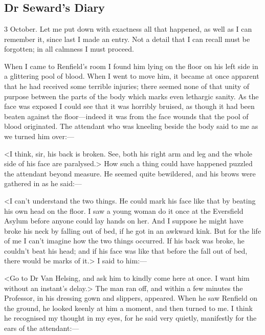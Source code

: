 \chapter[Chapter \thechapter]{}

\section{Dr Seward's Diary}
\begin{diary}{3 October.}
Let me put down with exactness all that happened, as well as I can remember it, since last I made an entry. Not a detail that I can recall must be forgotten; in all calmness I must proceed.

When I came to Renfield's room I found him lying on the floor on his left side in a glittering pool of blood. When I went to move him, it became at once apparent that he had received some terrible injuries; there seemed none of that unity of purpose between the parts of the body which marks even lethargic sanity. As the face was exposed I could see that it was horribly bruised, as though it had been beaten against the floor—indeed it was from the face wounds that the pool of blood originated. The attendant who was kneeling beside the body said to me as we turned him over:—

<I think, sir, his back is broken. See, both his right arm and leg and the whole side of his face are paralysed.> How such a thing could have happened puzzled the attendant beyond measure. He seemed quite bewildered, and his brows were gathered in as he said:—

<I can't understand the two things. He could mark his face like that by beating his own head on the floor. I saw a young woman do it once at the Eversfield Asylum before anyone could lay hands on her. And I suppose he might have broke his neck by falling out of bed, if he got in an awkward kink. But for the life of me I can't imagine how the two things occurred. If his back was broke, he couldn't beat his head; and if his face was like that before the fall out of bed, there would be marks of it.> I said to him:—

<Go to Dr Van Helsing, and ask him to kindly come here at once. I want him without an instant's delay.> The man ran off, and within a few minutes the Professor, in his dressing gown and slippers, appeared. When he saw Renfield on the ground, he looked keenly at him a moment, and then turned to me. I think he recognised my thought in my eyes, for he said very quietly, manifestly for the ears of the attendant:—


\end{diary}
